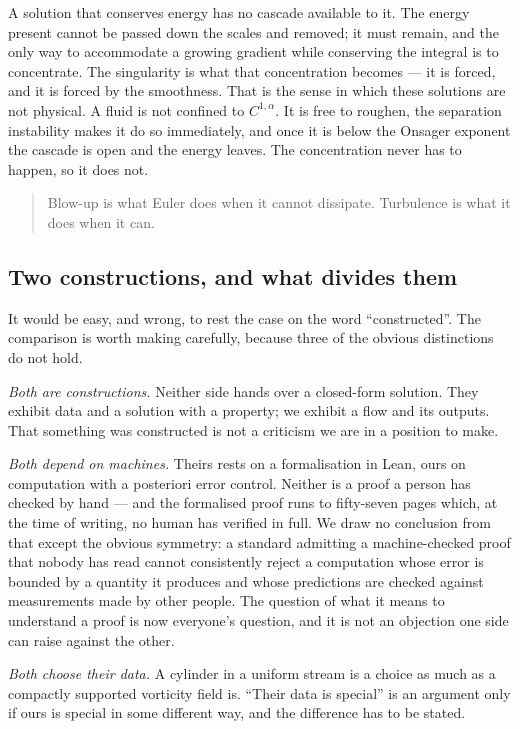 \documentclass[11pt]{article}
\begin{document}
A solution that conserves energy has no cascade available to it. The energy present cannot be
passed down the scales and removed; it must remain, and the only way to accommodate a growing
gradient while conserving the integral is to concentrate. The singularity is what that
concentration becomes --- it is forced, and it is forced by the smoothness. That is the sense in
which these solutions are not physical. A fluid is not confined to $C^{1,\alpha}$. It is free to
roughen, the separation instability makes it do so immediately, and once it is below the Onsager
exponent the cascade is open and the energy leaves. The concentration never has to happen, so it
does not.

\begin{quote}
Blow-up is what Euler does when it cannot dissipate. Turbulence is what it does when it can.
\end{quote}

\subsection{Two constructions, and what divides them}\label{sec:compare}

It would be easy, and wrong, to rest the case on the word ``constructed''. The comparison is worth
making carefully, because three of the obvious distinctions do not hold.

\emph{Both are constructions.} Neither side hands over a closed-form solution. They exhibit data and
a solution with a property; we exhibit a flow and its outputs. That something was constructed is not
a criticism we are in a position to make.

\emph{Both depend on machines.} Theirs rests on a formalisation in Lean, ours on computation with a
posteriori error control. Neither is a proof a person has checked by hand --- and the formalised
proof runs to fifty-seven pages which, at the time of writing, no human has verified in full. We
draw no conclusion from that except the obvious symmetry: a standard admitting a machine-checked
proof that nobody has read cannot consistently reject a computation whose error is bounded by a
quantity it produces and whose predictions are checked against measurements made by other people.
The question of what it means to understand a proof is now everyone's question, and it is not an
objection one side can raise against the other.

\emph{Both choose their data.} A cylinder in a uniform stream is a choice as much as a compactly
supported vorticity field is. ``Their data is special'' is an argument only if ours is special in
some different way, and the difference has to be stated.
\end{document}
